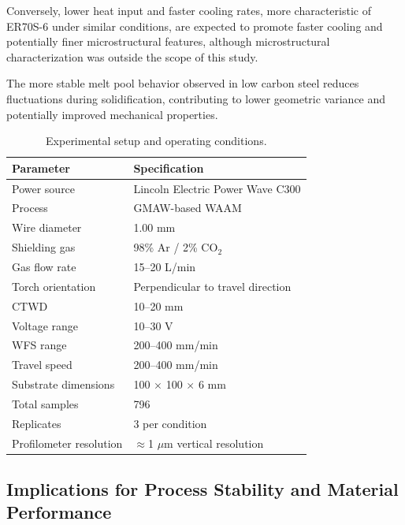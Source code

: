 \documentclass[conference]{IEEEtran}
\begin{document}
Conversely, lower heat input and faster cooling rates, more characteristic of ER70S-6 under similar conditions, are expected to promote faster cooling and potentially finer microstructural features, although microstructural characterization was outside the scope of this study.


The more stable melt pool behavior observed in low carbon steel reduces fluctuations during solidification, contributing to lower geometric variance and potentially improved mechanical properties.
\begin{table}[t]
\centering
\caption{Experimental setup and operating conditions.}
\label{tab:experimental_setup}

\footnotesize
\setlength{\tabcolsep}{3pt}
\renewcommand{\arraystretch}{1.10}

\begin{tabular}{p{} p{}}
\toprule
\textbf{Parameter} & \textbf{Specification} \\
\midrule

Power source & Lincoln Electric Power Wave C300 \\
Process & GMAW-based WAAM \\
Wire diameter & 1.00 mm \\
Shielding gas & 98\% Ar / 2\% CO$_2$ \\
Gas flow rate & 15–20 L/min \\
Torch orientation & Perpendicular to travel direction \\
CTWD & 10–20 mm \\
Voltage range & 10–30 V \\
WFS range & 200–400 mm/min \\
Travel speed & 200–400 mm/min \\
Substrate dimensions & 100 $\times$ 100 $\times$ 6 mm \\
Total samples & 796 \\
Replicates & 3 per condition \\
Profilometer resolution & $\approx$1 $\mu$m vertical resolution \\
\bottomrule
\end{tabular}

\end{table}

\subsection{Implications for Process Stability and Material Performance}
\end{document}
